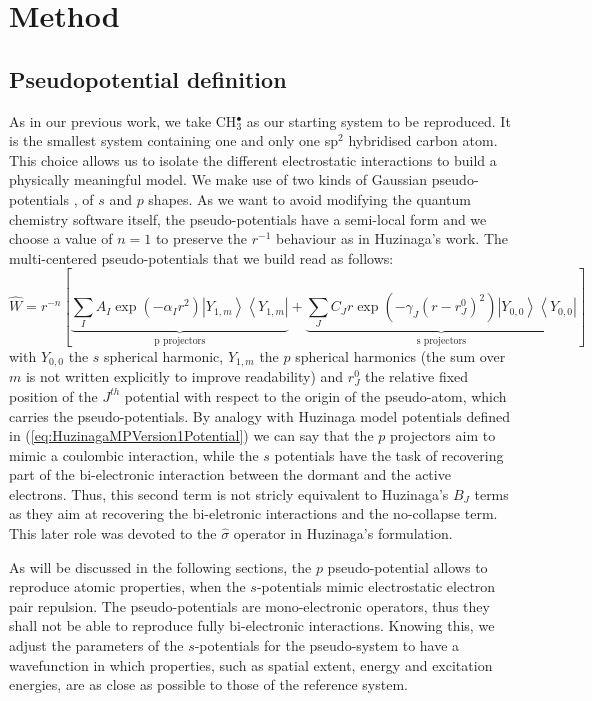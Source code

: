\documentclass[journal=jctcce,manuscript=article]{achemso}
\begin{document}
\section{Method}

\subsection{Pseudopotential definition}

As in our previous work\cite{drujon_pseudopotentials_2013},
we take CH\(^{\bullet}_{3}\) as our starting system to be reproduced.
It is the smallest system containing one and only one sp$^2$ hybridised carbon atom.
This choice allows us to isolate the different electrostatic interactions
to build a physically meaningful model.
We make use of two kinds of Gaussian pseudo-potentials \cite{me_structure_theory}, of \(s\) and \(p\) shapes. As we want to avoid modifying the quantum chemistry software itself, the pseudo-potentials have a semi-local form and we choose a value of \(n = 1\) to preserve the \(r^{-1}\) behaviour as in Huzinaga's work.
The multi-centered pseudo-potentials that we build read as follows:
\begin{equation}
\label{eq:ourPP}
\hat{W} = r^{-n}\left[%
\underbrace{\sum_IA_I\exp(-\alpha_I r^2)\left|Y_{1,m}\right>\left<Y_{1,m}\right|}_{\text{p projectors}}%
+%
\underbrace{\sum_JC_Jr\exp(-\gamma_J (r-r^0_J)^2)\left|Y_{0,0}\right>\left<Y_{0,0}\right|}_{\text{s projectors}}%
\right]
\end{equation}
with $Y_{0,0}$ the $s$ spherical harmonic, $Y_{1,m}$ the $p$ spherical harmonics (the sum over $m$
is not written explicitly to improve readability) and $r^0_J$ the relative fixed position of the $J^{th}$
potential with respect to the origin of the pseudo-atom, which carries the pseudo-potentials.
By analogy with Huzinaga model potentials defined in (\ref{eq:HuzinagaMPVersion1Potential})
we can say that the $p$ projectors aim to mimic a coulombic interaction,
while the $s$ potentials have the task of recovering part of the bi-electronic interaction
between the dormant and the active electrons.
Thus, this second term is not stricly equivalent to Huzinaga's $B_J$ terms as they aim at recovering
the bi-eletronic interactions and the no-collapse term.
This later role was devoted to the $\hat{\sigma}$ operator in Huzinaga's formulation.

As will be discussed in the following sections,
the \(p\) pseudo-potential allows to reproduce atomic properties, when the
\(s\)-potentials mimic electrostatic electron pair repulsion. The pseudo-potentials are mono-electronic operators, thus they shall not be able to reproduce fully bi-electronic interactions. Knowing this, we adjust the parameters of the \(s\)-potentials for the pseudo-system to have a wavefunction in which properties, such as spatial extent, energy and excitation energies, are as close as possible to those of the reference system.
\end{document}
